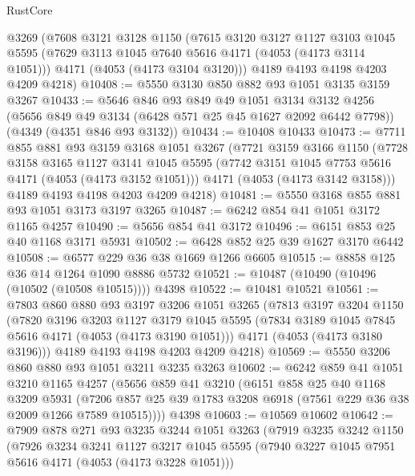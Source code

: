 \begin{lexlean}{RustCore}
\begin{coremodule}
    @3269
    (@7608
      @3121
      @3128
      @1150
      (@7615
        @3120
        @3127
        @1127
        @3103
        @1045
        @5595
        (@7629 @3113 @1045 @7640 @5616 @4171 (@4053 (@4173 @3114 @1051)))
        @4171
        (@4053 (@4173 @3104 @3120)))
      @4189
      @4193
      @4198
      @4203
      @4209
      @4218)
@10408 := @5550 @3130 @850 @882 @93 @1051 @3135 @3159 @3267
@10433 := @5646
    @846
    @93
    @849
    @49
    @1051
    @3134
    @3132
    @4256
    (@5656 @849 @49 @3134 (@6428 @571 @25 @45 @1627 @2092 @6442 @7798))
    (@4349 (@4351 @846 @93 @3132))
@10434 := @10408 @10433
@10473 := @7711
    @855
    @881
    @93
    @3159
    @3168
    @1051
    @3267
    (@7721
      @3159
      @3166
      @1150
      (@7728
        @3158
        @3165
        @1127
        @3141
        @1045
        @5595
        (@7742 @3151 @1045 @7753 @5616 @4171 (@4053 (@4173 @3152 @1051)))
        @4171
        (@4053 (@4173 @3142 @3158)))
      @4189
      @4193
      @4198
      @4203
      @4209
      @4218)
@10481 := @5550 @3168 @855 @881 @93 @1051 @3173 @3197 @3265
@10487 := @6242 @854 @41 @1051 @3172 @1165 @4257
@10490 := @5656 @854 @41 @3172
@10496 := @6151 @853 @25 @40 @1168 @3171 @5931
@10502 := @6428 @852 @25 @39 @1627 @3170 @6442
@10508 := @6577 @229 @36 @38 @1669 @1266 @6605
@10515 := @8858 @125 @36 @14 @1264 @1090 @8886 @5732
@10521 := @10487 (@10490 (@10496 (@10502 (@10508 @10515)))) @4398
@10522 := @10481 @10521
@10561 := @7803
    @860
    @880
    @93
    @3197
    @3206
    @1051
    @3265
    (@7813
      @3197
      @3204
      @1150
      (@7820
        @3196
        @3203
        @1127
        @3179
        @1045
        @5595
        (@7834 @3189 @1045 @7845 @5616 @4171 (@4053 (@4173 @3190 @1051)))
        @4171
        (@4053 (@4173 @3180 @3196)))
      @4189
      @4193
      @4198
      @4203
      @4209
      @4218)
@10569 := @5550 @3206 @860 @880 @93 @1051 @3211 @3235 @3263
@10602 := @6242
    @859
    @41
    @1051
    @3210
    @1165
    @4257
    (@5656
      @859
      @41
      @3210
      (@6151
        @858
        @25
        @40
        @1168
        @3209
        @5931
        (@7206 @857 @25 @39 @1783 @3208 @6918 (@7561 @229 @36 @38 @2009 @1266 @7589 @10515))))
    @4398
@10603 := @10569 @10602
@10642 := @7909
    @878
    @271
    @93
    @3235
    @3244
    @1051
    @3263
    (@7919
      @3235
      @3242
      @1150
      (@7926
        @3234
        @3241
        @1127
        @3217
        @1045
        @5595
        (@7940 @3227 @1045 @7951 @5616 @4171 (@4053 (@4173 @3228 @1051)))

\end{coremodule}
\end{lexlean}
